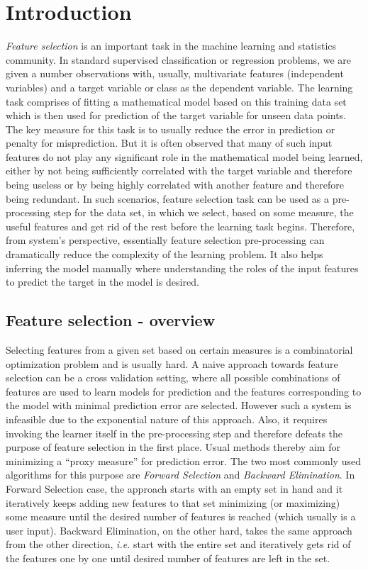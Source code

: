 \chapter{Introduction}

\emph{Feature selection} is an important task in the machine learning and statistics community. In standard supervised classification or regression problems, we are given a number observations with, usually, multivariate features (independent variables) and a target variable or class as the dependent variable. The learning task comprises of fitting a mathematical model based on this training data set which is then used for prediction of the target variable for unseen data points. The key measure for this task is to usually reduce the error in prediction or penalty for misprediction. But it is often observed that many of such input features do not play any significant role in the mathematical model being learned, either by not being sufficiently correlated with the target variable and therefore being useless or by being highly correlated with another feature and therefore being redundant. In such scenarios, feature selection task can be used as a pre-processing step for the data set, in which we select, based on some measure, the useful features and get rid of the rest before the learning task begins. Therefore, from system's perspective, essentially feature selection pre-processing can dramatically reduce the complexity of the learning problem. It also helps inferring the model manually where understanding the roles of the input features to predict the target in the model is desired.

\section{Feature selection - overview}
Selecting features from a given set based on certain measures is a combinatorial optimization problem and is usually hard. A naive approach towards feature selection can be a cross validation setting, where all possible combinations of features are used to learn models for prediction and the features corresponding to the model with minimal prediction error are selected. However such a system is infeasible due to the exponential nature of this approach. Also, it requires invoking the learner itself in the pre-processing step and therefore defeats the purpose of feature selection in the first place. Usual methods thereby aim for minimizing a ``proxy measure'' for prediction error. The two most commonly used algorithms for this purpose are \emph{Forward Selection} and \emph{Backward Elimination}. In Forward Selection case, the approach starts with an empty set in hand and it iteratively keeps adding new features to that set minimizing (or maximizing) some measure until the desired number of features is reached (which usually is a user input). Backward Elimination, on the other hard, takes the same approach from the other direction, \textit{i.e.} start with the entire set and iteratively gets rid of the features one by one until desired number of features are left in the set.

